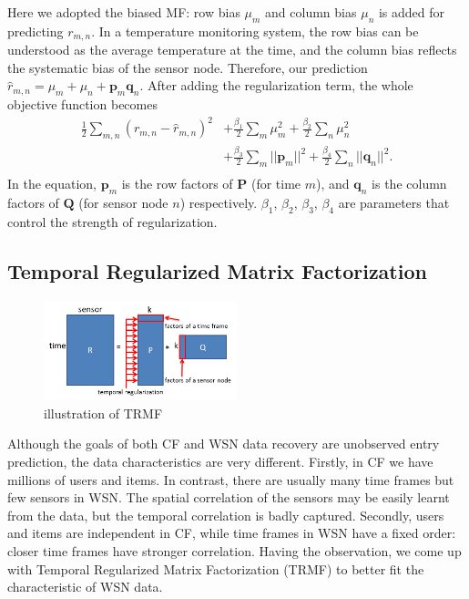 Here we adopted the biased MF: row bias $\mu_m$ and column bias $\mu_n$ is added for predicting $r_{m,n}$. In a temperature monitoring system, the row bias can be understood as the average temperature at the time, and the column bias reflects the systematic bias of the sensor node. Therefore, our prediction $\hat{r}_{m,n} = \mu_m + \mu_n + \mathbf{p}_m \mathbf{q}_n$. After adding the regularization term, the whole objective function becomes
\begin{equation*}\begin{aligned}
\frac{1}{2}\sum_{m,n}{(r_{m,n} - \hat{r}_{m,n})}^2 & + \frac{\beta_1}{2}\sum_m{\mu_m^2} + \frac{\beta_2}{2}\sum_n{\mu_n^2}\\
& + \frac{\beta_3}{2}\sum_m{||\mathbf{p}_m||^2} + \frac{\beta_4}{2}\sum_n{||\mathbf{q}_n||^2}.\\
\end{aligned}\end{equation*}
In the equation, $\mathbf{p}_m$ is the row factors of $\mathbf{P}$ (for time $m$), and $\mathbf{q}_n$ is the column factors of $\mathbf{Q}$ (for sensor node $n$) respectively. $\beta_1$, $\beta_2$, $\beta_3$, $\beta_4$ are parameters that control the strength of regularization.

\subsection{Temporal Regularized Matrix Factorization}

\begin{figure}[htbp]
	\centering
	\includegraphics[width=0.5\textwidth]{TRMF_illustration.png}
	\caption{illustration of TRMF}
\end{figure}


Although the goals of both CF and WSN data recovery are unobserved entry prediction, the data characteristics are very different. Firstly, in CF we have millions of users and items. In contrast, there are usually many time frames but few sensors in WSN. The spatial correlation of the sensors may be easily learnt from the data, but the temporal correlation is badly captured. Secondly, users and items are independent in CF, while time frames in WSN have a fixed order: closer time frames have stronger correlation. Having the observation, we come up with Temporal Regularized Matrix Factorization (TRMF) to better fit the characteristic of WSN data. 

